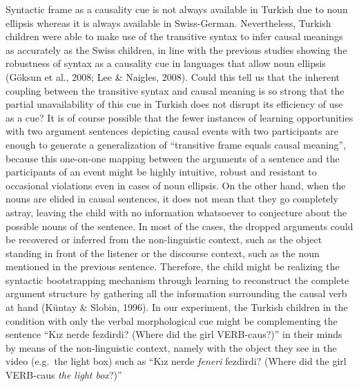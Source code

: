 \documentclass[man]{apa6}
\begin{document}
Syntactic frame as a causality cue is not always available in Turkish
due to noun ellipsis whereas it is always available in Swiss-German.
Nevertheless, Turkish children were able to make use of the transitive
syntax to infer causal meanings as accurately as the Swiss children, in
line with the previous studies showing the robustness of syntax as a
causality cue in languages that allow noun ellipsis (Göksun et al.,
2008; Lee \& Naigles, 2008). Could this tell us that the inherent
coupling between the transitive syntax and causal meaning is so strong
that the partial unavailability of this cue in Turkish does not disrupt
its efficiency of use as a cue? It is of course possible that the fewer
instances of learning opportunities with two argument sentences
depicting causal events with two participants are enough to generate a
generalization of \enquote{transitive frame equals causal meaning},
because this one-on-one mapping between the arguments of a sentence and
the participants of an event might be highly intuitive, robust and
resistant to occasional violations even in cases of noun ellipsis. On
the other hand, when the nouns are elided in causal sentences, it does
not mean that they go completely astray, leaving the child with no
information whatsoever to conjecture about the possible nouns of the
sentence. In most of the cases, the dropped arguments could be recovered
or inferred from the non-linguistic context, such as the object standing
in front of the listener or the discourse context, such as the noun
mentioned in the previous sentence. Therefore, the child might be
realizing the syntactic bootstrapping mechanism through learning to
reconstruct the complete argument structure by gathering all the
information surrounding the causal verb at hand (Küntay \& Slobin,
1996). In our experiment, the Turkish children in the condition with
only the verbal morphological cue might be complementing the sentence
\enquote{Kız nerde fezdirdi? (Where did the girl VERB-caus?)} in their
minds by means of the non-linguistic context, namely with the object
they see in the video (e.g.~the light box) such as \enquote{Kız nerde
\emph{feneri} fezdirdi? (Where did the girl VERB-caus \emph{the light
box}?)}
\end{document}

